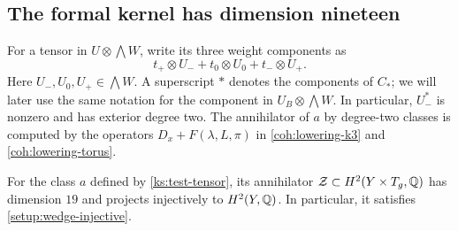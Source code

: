 \subsection{The formal kernel has dimension nineteen}
\label{ks:formal-kernel-section}

For a tensor in $U\otimes\bigwedge W$, write its three weight
components as
\begin{equation}
 \label{ks:weight-components}
 t_+\otimes U_-+t_0\otimes U_0+t_-\otimes U_+.
\end{equation}
Here $U_-,U_0,U_+\in\bigwedge W$.  A superscript $*$ denotes
the components of $C_*$; we will later use the same notation for
the component in $U_B\otimes\bigwedge W$.
In particular, $U_-^*$ is nonzero and has exterior degree two.
The annihilator of $a$ by degree-two classes is computed by
the operators $D_x+F(\lambda,L,\pi)$ in
\eqref{coh:lowering-k3} and \eqref{coh:lowering-torus}.

\begin{lemma}
 \label{ks:formal-kernel}
For the class $a$ defined by \eqref{ks:test-tensor}, its
annihilator $\mathcal Z\subset H^2(Y\times T_g,\mathbb Q)$ has
dimension $19$ and projects injectively to $H^2(Y,\mathbb Q)$.
In particular, it satisfies \eqref{setup:wedge-injective}.
\end{lemma}

